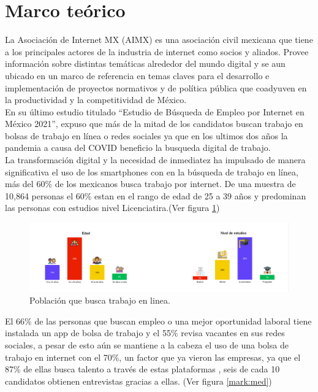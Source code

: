 \clearpage
\section{Marco teórico}
    La Asociación de Internet MX (AIMX) es una asociación civil mexicana que tiene a los principales actores de la industria 
    de internet como socios y aliados. Provee información sobre distintas temáticas alrededor del mundo digital y se aun ubicado 
    en un marco de referencia en temas claves para el desarrollo e implementación de proyectos normativos y de política pública 
    que coadyuven en la productividad y la competitividad de México.\\ 

    En su último  estudio titulado ``Estudio de Búsqueda de Empleo por Internet en México 2021'', expuso que más de la mitad de 
    los candidatos buscan trabajo en bolsas de trabajo en línea o redes sociales ya que en los ultimos dos años
    la pandemia a causa del COVID beneficio la busqueda digital de trabajo.\cite{AIMX}\\
    \newline
    La transformación digital y la necesidad de inmediatez ha impulsado de manera significativa el uso de los smartphones con 
    en la búsqueda de trabajo en línea, más del 60\% de los mexicanos busca trabajo por internet. De una muestra de 10,864 personas
    el 60\% estan en el rango de edad de 25 a 39 años y predominan las personas con estudios nivel Licenciatira.(Ver figura \ref{mark:pob}) 
    \begin{figure}[H]
        \begin{center}
            \includegraphics[width=.9\textwidth]{antecedentes/imagenes/porcen.jpeg}
        \end{center}
        \caption{Población que busca trabajo en linea.}
        \label{mark:pob}
    \end{figure}
    
    El 66\% de las personas que buscan empleo o una mejor oportunidad laboral tiene instalada un app de bolsa de trabajo y el 55\% 
    revisa vacantes en sus redes sociales, a pesar de esto aún se mantiene a la cabeza el uso de una bolsa de
    trabajo en internet con el 70\%, un factor que ya vieron las empresas, ya que el 87\% de ellas busca
    talento a través de estas plataformas , seis de cada 10 candidatos obtienen entrevistas gracias a ellas. \cite{AIMX}(Ver figura \ref{mark:med})

